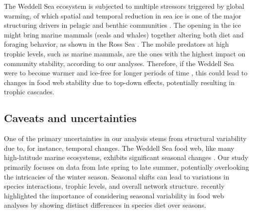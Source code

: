 \documentclass[gc, manuscript]{copernicus}
\begin{document}
The Weddell Sea ecosystem is subjected to multiple stressors triggered
by global warming, of which spatial and temporal reduction in sea ice is
one of the major structuring drivers in pelagic and benthic communities
\citep{Constable2014, Gutt2021}. The opening in the ice might bring
marine mammals (seals and whales) together altering both diet and
foraging behavior, as shown in the Ross Sea \citep{Ainley2015}. The
mobile predators at high trophic levels, such as marine mammals, are the
ones with the highest impact on community stability, according to our
analyses. Therefore, if the Weddell Sea were to become warmer and
ice-free for longer periods of time \citep{Turner2020}, this could lead
to changes in food web stability due to top-down effects, potentially
resulting in trophic cascades.

\subsection{Caveats and uncertainties}

One of the primary uncertainties in our analysis stems from structural
variability due to, for instance, temporal changes. The Weddell Sea food
web, like many high-latitude marine ecosystems, exhibits significant
seasonal changes
\citep{McMeans2015, Rossi2019, Kortsch2021, Pecuchet2022}. Our study
primarily focuses on data from late spring to late summer, potentially
overlooking the intricacies of the winter season. Seasonal shifts can
lead to variations in species interactions, trophic levels, and overall
network structure. \citet{Novotny2023} recently highlighted the
importance of considering seasonal variability in food web analyses by
showing distinct differences in species diet over seasons.
\end{document}

